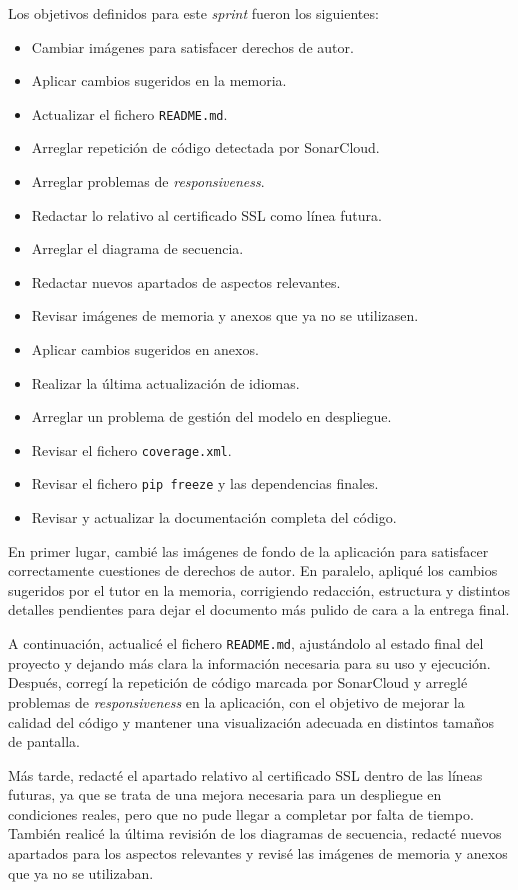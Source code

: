 Los objetivos definidos para este \textit{sprint} fueron los siguientes:
\begin{itemize}
	\item Cambiar imágenes para satisfacer derechos de autor.
	\item Aplicar cambios sugeridos en la memoria.
	\item Actualizar el fichero \texttt{README.md}.
	\item Arreglar repetición de código detectada por SonarCloud.
	\item Arreglar problemas de \textit{responsiveness}.
	\item Redactar lo relativo al certificado SSL como línea futura.
	\item Arreglar el diagrama de secuencia.
	\item Redactar nuevos apartados de aspectos relevantes.
	\item Revisar imágenes de memoria y anexos que ya no se utilizasen.
	\item Aplicar cambios sugeridos en anexos.
	\item Realizar la última actualización de idiomas.
	\item Arreglar un problema de gestión del modelo en despliegue.
	\item Revisar el fichero \texttt{coverage.xml}.
	\item Revisar el fichero \texttt{pip freeze} y las dependencias finales.
	\item Revisar y actualizar la documentación completa del código.
\end{itemize}

En primer lugar, cambié las imágenes de fondo de la aplicación para satisfacer correctamente cuestiones de derechos de autor. En paralelo, apliqué los cambios sugeridos por el tutor en la memoria, corrigiendo redacción, estructura y distintos detalles pendientes para dejar el documento más pulido de cara a la entrega final.

A continuación, actualicé el fichero \texttt{README.md}, ajustándolo al estado final del proyecto y dejando más clara la información necesaria para su uso y ejecución. Después, corregí la repetición de código marcada por SonarCloud y arreglé problemas de \textit{responsiveness} en la aplicación, con el objetivo de mejorar la calidad del código y mantener una visualización adecuada en distintos tamaños de pantalla.

Más tarde, redacté el apartado relativo al certificado SSL dentro de las líneas futuras, ya que se trata de una mejora necesaria para un despliegue en condiciones reales, pero que no pude llegar a completar por falta de tiempo. También realicé la última revisión de los diagramas de secuencia, redacté nuevos apartados para los aspectos relevantes y revisé las imágenes de memoria y anexos que ya no se utilizaban.

